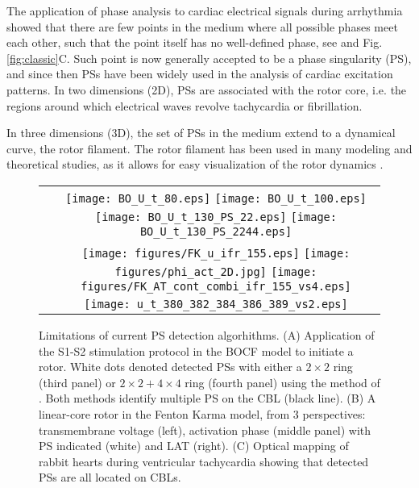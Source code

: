 \documentclass[aps,pre,amsfonts,amssymb,amsmath,twocolumn, superscriptaddress]{revtex4-1}
\begin{document}
The application of phase analysis to cardiac electrical signals during arrhythmia showed that there are few points in the medium where all possible phases meet each other, such that the point itself has no well-defined phase, see \citep{Gray:1998} and Fig. \ref{fig:classic}C. Such point is now generally accepted to be a phase singularity (PS), and since then PSs have been widely used in the analysis of cardiac excitation patterns. 
In two dimensions (2D), PSs are associated with the rotor core, i.e. the regions around which electrical waves revolve tachycardia or fibrillation. 

In three dimensions (3D), the set of PSs in the medium extend to a dynamical curve, the rotor filament. The rotor filament has been used in many modeling and theoretical studies, as it allows for easy visualization of the rotor dynamics \citep{Clayton:2005,Wellner:2002, Verschelde:2007,Dierckx:2012}. 

\begin{figure*}
 \begin{tabular}{ c c}
\raisebox{3.1cm}{\textbf{A}}  &  \texttt{[image: BO\_U\_t\_80.eps]}
 \texttt{[image: BO\_U\_t\_100.eps]}
     \texttt{[image: BO\_U\_t\_130\_PS\_22.eps]}
    \texttt{[image: BO\_U\_t\_130\_PS\_2244.eps]} 
 \\
\raisebox{4.1cm}{\textbf{B}}  &  \texttt{[image: figures/FK\_u\_ifr\_155.eps]}
   \texttt{[image: figures/phi\_act\_2D.jpg]}
    \texttt{[image: figures/FK\_AT\_cont\_combi\_ifr\_155\_vs4.eps]}\\
    \raisebox{5cm}{\textbf{C}}&
    \texttt{[image: u\_t\_380\_382\_384\_386\_389\_vs2.eps]}
 
\end{tabular}
    \caption{Limitations of current PS detection algorhithms. (A) Application of the S1-S2 stimulation protocol in the BOCF \citep{BuenoOrovio:2008} model to initiate a rotor. White dots denoted detected PSs with either a $2\times2$ ring (third panel) or $2\times2+4\times4$ ring (fourth panel) using the method of \cite{Kuklik:2017}. Both methods identify multiple PS on the CBL (black line). %
     (B) A linear-core rotor in the Fenton Karma model, from 3 perspectives: transmembrane voltage (left), activation phase (middle panel) with PS indicated (white) and LAT (right). (C) Optical mapping of rabbit hearts during ventricular tachycardia showing that detected PSs are all located on CBLs.}
    \label{fig:problems}
\end{figure*}
\end{document}
